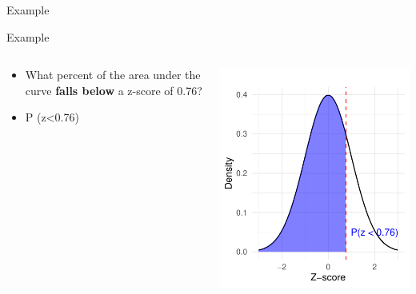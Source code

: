 \documentclass[
  ignorenonframetext,
]{beamer}
\providecommand{\tightlist}{%
  \setlength{\itemsep}{0pt}\setlength{\parskip}{0pt}}
\begin{document}
\begin{frame}{Example}
\label{example}
\end{frame}

\begin{frame}{Example}
\label{example-1}
\begin{columns}[T]
\begin{column}{0.5\textwidth}
\vspace{1cm}

\begin{itemize}
\tightlist
\item
  What percent of the area under the curve \textbf{falls below} a
  z-score of 0.76?
\end{itemize}

\begin{itemize}
\tightlist
\item
  P (z\textless0.76)
\end{itemize}
\end{column}

\begin{column}{0.5\textwidth}
\vspace{1cm}

\includegraphics{M5-Hypothesis-Testing,-Probability-and-Distribution_files/figure-beamer/unnamed-chunk-16-1.pdf}
\end{column}
\end{columns}
\end{frame}
\end{document}

